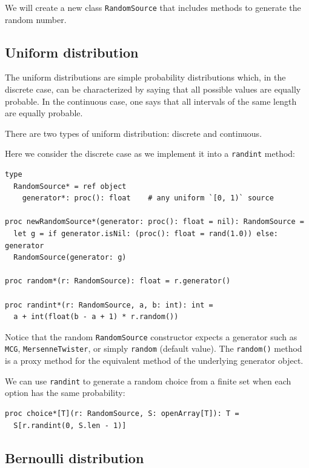 \documentclass[justified, sixbynine]{tufte-book}
\def\ft{\small\tt}
\theoremstyle{plain}%
\newtheorem * {corollary}{Corollary}
\theoremstyle{definition}
\theoremstyle{remark}
\newtheorem * {remark}{Remark}
\newtheorem * {note}{Note}
\begin{document}
\begin{fullwidth}
We will create a new class {\ft RandomSource} that includes methods to generate the random number.

\goodbreak\subsection{Uniform distribution}

The uniform distributions are simple probability distributions which, in the
discrete case, can be characterized by saying that all possible values are
equally probable. In the continuous case, one says that all intervals of the
same length are equally probable.

There are two types of uniform distribution: discrete and continuous.

Here we consider the discrete case as we implement it into a {\ft randint} method:


\begin{lstlisting}[caption={in file: {\ft nlib/randomgen.nim}}]
type
  RandomSource* = ref object
    generator*: proc(): float    # any uniform `[0, 1)` source

proc newRandomSource*(generator: proc(): float = nil): RandomSource =
  let g = if generator.isNil: (proc(): float = rand(1.0)) else: generator
  RandomSource(generator: g)

proc random*(r: RandomSource): float = r.generator()

proc randint*(r: RandomSource, a, b: int): int =
  a + int(float(b - a + 1) * r.random())
\end{lstlisting}

Notice that the random {\ft RandomSource} constructor expects a generator such as {\ft MCG}, {\ft MersenneTwister}, or simply {\ft random} (default value). The {\ft random()} method is a proxy method for the equivalent method of the underlying generator object.

We can use {\ft randint} to generate a random choice from a finite set when each option has the same probability:

\begin{lstlisting}[caption={in file: {\ft nlib/randomgen.nim}}]
proc choice*[T](r: RandomSource, S: openArray[T]): T =
  S[r.randint(0, S.len - 1)]
\end{lstlisting}

\goodbreak\subsection{Bernoulli distribution}


\end{fullwidth}
\end{document}

